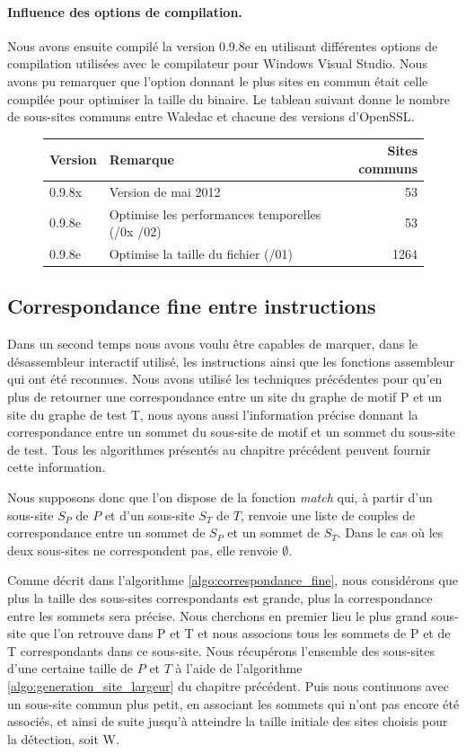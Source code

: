 \paragraph{Influence des options de compilation.}
Nous avons ensuite compilé la version 0.9.8e en utilisant différentes options de compilation utilisées avec le compilateur pour Windows Visual Studio.
Nous avons pu remarquer que l'option donnant le plus sites en commun était celle compilée pour optimiser la taille du binaire. Le tableau suivant donne le nombre de sous-sites communs entre Waledac et chacune des versions d'OpenSSL.

\begin{figure}[h]
\begin{center}
\begin{tabular}{|l|l|r|}
 \hline
Version & Remarque & Sites communs \\
 \hline
0.9.8x & Version de mai 2012 & 53 \\
0.9.8e & Optimise les performances temporelles (/0x /02) & 53 \\
0.9.8e & Optimise la taille du fichier (/01) & 1264 \\
 \hline
\end{tabular}
\end{center}
\end{figure}

\subsection{Correspondance fine entre instructions}
Dans un second temps nous avons voulu être capables de marquer, dans le désassembleur interactif utilisé, les instructions ainsi que les fonctions assembleur qui ont été reconnues.
Nous avons utilisé les techniques précédentes pour qu'en plus de retourner une correspondance entre un site du graphe de motif P et un site du graphe de test T, nous ayons aussi l'information précise donnant la correspondance entre un sommet du sous-site de motif et un sommet du sous-site de test. Tous les algorithmes présentés au chapitre précédent peuvent fournir cette information.

Nous supposons donc que l'on dispose de la fonction \emph{match} qui, à partir d'un sous-site $S_P$ de $P$ et d'un sous-site $S_T$ de $T$, renvoie une liste de couples de correspondance entre un sommet de $S_P$ et un sommet de $S_T$. Dans le cas où les deux sous-sites ne correspondent pas, elle renvoie $\emptyset$.

Comme décrit dans l'algorithme \ref{algo:correspondance_fine}, nous considérons que plus la taille des sous-sites correspondants est grande, plus la correspondance entre les sommets sera précise.
Nous cherchons en premier lieu le plus grand sous-site que l'on retrouve dans P et T et nous associons tous les sommets de P et de T  correspondants dans ce sous-site. Nous récupérons l'ensemble des sous-sites d'une certaine taille de $P$ et $T$ à l'aide de l'algorithme \ref{algo:generation_site_largeur} du chapitre précédent.
Puis nous continuons avec un sous-site commun plus petit, en associant les sommets qui n'ont pas encore été associés, et ainsi de suite jusqu'à atteindre la taille initiale des sites choisis pour la détection, soit W. 

